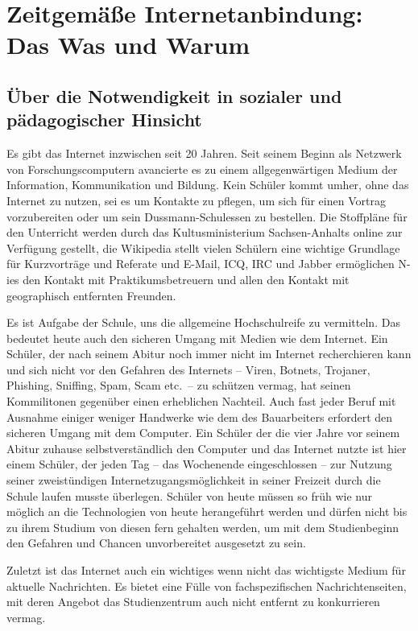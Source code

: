 \documentclass[10pt,a4paper,notitlepage]{scrartcl}
\begin{document}
\setlength{\columnsep}{1cm}
\section{Zeitgemäße Internetanbindung: Das Was und Warum}
\subsection{Über die Notwendigkeit in sozialer und pädagogischer Hinsicht}
\begin{multicols}{2}
Es gibt das Internet inzwischen seit 20 Jahren. Seit seinem Beginn als Netzwerk von Forschungscomputern avancierte es zu einem allgegenwärtigen Medium der Information, Kommunikation und Bildung. Kein Schüler kommt umher, ohne das Internet zu nutzen, sei es um Kontakte zu pflegen, um sich für einen Vortrag vorzubereiten oder um sein Dussmann-Schulessen zu bestellen. Die Stoffpläne für den Unterricht werden durch das Kultusministerium Sachsen-Anhalts online zur Verfügung gestellt, die Wikipedia stellt vielen Schülern eine wichtige Grundlage für Kurzvorträge und Referate und E-Mail, ICQ, IRC und Jabber ermöglichen N-ies den Kontakt mit Praktikumsbetreuern und allen den Kontakt mit geographisch entfernten Freunden.

Es ist Aufgabe der Schule, uns die allgemeine Hochschulreife zu vermitteln. Das bedeutet heute auch den sicheren Umgang mit Medien wie dem Internet. Ein Schüler, der nach seinem Abitur noch immer nicht im Internet recherchieren kann und sich nicht vor den Gefahren des Internets -- Viren, Botnets, Trojaner, Phishing, Sniffing, Spam, Scam etc.\ -- zu schützen vermag, hat seinen Kommilitonen gegenüber einen erheblichen Nachteil. Auch fast jeder Beruf mit Ausnahme einiger weniger Handwerke wie dem des Bauarbeiters erfordert den sicheren Umgang mit dem Computer. Ein Schüler der die vier Jahre vor seinem Abitur zuhause selbstverständlich den Computer und das Internet nutzte ist hier einem Schüler, der jeden Tag -- das Wochenende eingeschlossen -- zur Nutzung seiner zweistündigen Internetzugangsmöglichkeit in seiner Freizeit durch die Schule laufen musste überlegen. Schüler von heute müssen so früh wie nur möglich an die Technologien von heute herangeführt werden und dürfen nicht bis zu ihrem Studium von diesen fern gehalten werden, um mit dem Studienbeginn den Gefahren und Chancen unvorbereitet ausgesetzt zu sein.

Zuletzt ist das Internet auch ein wichtiges wenn nicht das wichtigste Medium für aktuelle Nachrichten. Es bietet eine Fülle von fachspezifischen Nachrichtenseiten, mit deren Angebot das Studienzentrum auch nicht entfernt zu konkurrieren vermag.
\end{multicols}
\end{document}
